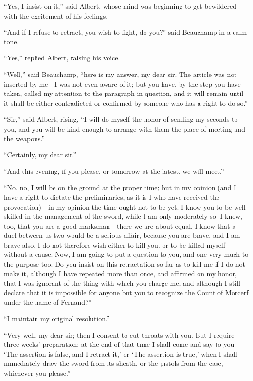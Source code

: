 “Yes, I insist on it,” said Albert, whose mind was beginning to get
bewildered with the excitement of his feelings.

“And if I refuse to retract, you wish to fight, do you?” said Beauchamp
in a calm tone.

“Yes,” replied Albert, raising his voice.

“Well,” said Beauchamp, “here is my answer, my dear sir. The article
was not inserted by me—I was not even aware of it; but you have, by the
step you have taken, called my attention to the paragraph in question,
and it will remain until it shall be either contradicted or confirmed
by someone who has a right to do so.”

“Sir,” said Albert, rising, “I will do myself the honor of sending my
seconds to you, and you will be kind enough to arrange with them the
place of meeting and the weapons.”

“Certainly, my dear sir.”

“And this evening, if you please, or tomorrow at the latest, we will
meet.”

“No, no, I will be on the ground at the proper time; but in my opinion
(and I have a right to dictate the preliminaries, as it is I who have
received the provocation)—in my opinion the time ought not to be yet. I
know you to be well skilled in the management of the sword, while I am
only moderately so; I know, too, that you are a good marksman—there we
are about equal. I know that a duel between us two would be a serious
affair, because you are brave, and I am brave also. I do not therefore
wish either to kill you, or to be killed myself without a cause. Now, I
am going to put a question to you, and one very much to the purpose
too. Do you insist on this retractation so far as to kill me if I do
not make it, although I have repeated more than once, and affirmed on
my honor, that I was ignorant of the thing with which you charge me,
and although I still declare that it is impossible for anyone but you
to recognize the Count of Morcerf under the name of Fernand?”

“I maintain my original resolution.”

“Very well, my dear sir; then I consent to cut throats with you. But I
require three weeks’ preparation; at the end of that time I shall come
and say to you, ‘The assertion is false, and I retract it,’ or ‘The
assertion is true,’ when I shall immediately draw the sword from its
sheath, or the pistols from the case, whichever you please.”

